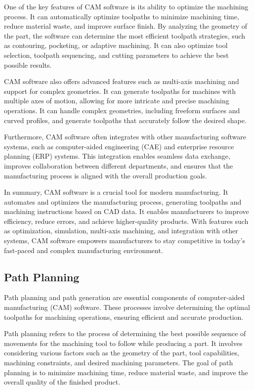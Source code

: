 One of the key features of CAM software is its ability to optimize the machining process. It can automatically optimize toolpaths to minimize machining time, reduce material waste, and improve surface finish. By analyzing the geometry of the part, the software can determine the most efficient toolpath strategies, such as contouring, pocketing, or adaptive machining. It can also optimize tool selection, toolpath sequencing, and cutting parameters to achieve the best possible results.

CAM software also offers advanced features such as multi-axis machining and support for complex geometries. It can generate toolpaths for machines with multiple axes of motion, allowing for more intricate and precise machining operations. It can handle complex geometries, including freeform surfaces and curved profiles, and generate toolpaths that accurately follow the desired shape.

Furthermore, CAM software often integrates with other manufacturing software systems, such as computer-aided engineering (CAE) and enterprise resource planning (ERP) systems. This integration enables seamless data exchange, improves collaboration between different departments, and ensures that the manufacturing process is aligned with the overall production goals.

In summary, CAM software is a crucial tool for modern manufacturing. It automates and optimizes the manufacturing process, generating toolpaths and machining instructions based on CAD data. It enables manufacturers to improve efficiency, reduce errors, and achieve higher-quality products. With features such as optimization, simulation, multi-axis machining, and integration with other systems, CAM software empowers manufacturers to stay competitive in today's fast-paced and complex manufacturing environment.
\subsection{Path Planning}
Path planning and path generation are essential components of computer-aided manufacturing (CAM) software. These processes involve determining the optimal toolpaths for machining operations, ensuring efficient and accurate production.

Path planning refers to the process of determining the best possible sequence of movements for the machining tool to follow while producing a part. It involves considering various factors such as the geometry of the part, tool capabilities, machining constraints, and desired machining parameters. The goal of path planning is to minimize machining time, reduce material waste, and improve the overall quality of the finished product.


